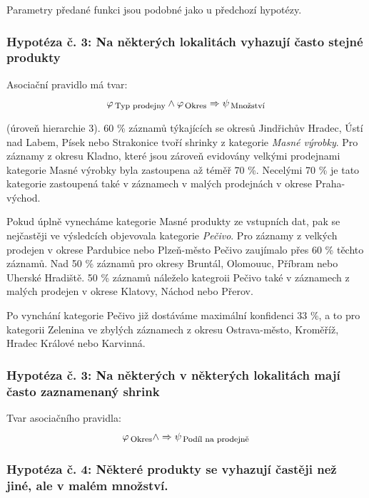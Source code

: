 Parametry předané funkci jsou podobné jako u předchozí hypotézy.

\subsubsection*{Hypotéza č. 3: Na některých lokalitách vyhazují často stejné produkty}

Asociační pravidlo má tvar:
\begin{equation}
    \varphi_{\mbox{\,\footnotesize Typ prodejny}} \land \varphi_{\,\mbox{\footnotesize Okres}} \Rightarrow \psi_{\mbox{\,\footnotesize Množství}}
\end{equation}

(úroveň hierarchie 3). 
60 \% záznamů týkajících se okresů Jindřichův Hradec, Ústí nad Labem, Písek nebo Strakonice tvoří shrinky z kategorie \emph{Masné výrobky}. Pro záznamy z okresu Kladno, které jsou zároveň evidovány velkými prodejnami kategorie Masné výrobky byla zastoupena až téměř 70 \%. Necelými 70 \% je tato kategorie zastoupená také v záznamech v malých prodejnách v okrese Praha-východ.

Pokud úplně vynecháme kategorie Masné produkty ze vstupních dat, pak se nejčastěji ve výsledcích objevovala kategorie \emph{Pečivo}. Pro záznamy z velkých prodejen v okrese Pardubice nebo Plzeň-město Pečivo zaujímalo přes 60 \% těchto záznamů. Nad 50 \% záznamů pro okresy Bruntál, Olomouuc, Příbram nebo Uherské Hradiště. 50 \% záznamů náleželo kategroii Pečivo také v záznamech z malých prodejen v okrese Klatovy, Náchod nebo Přerov.

Po vynchání kategorie Pečivo již dostáváme maximální konfidenci 33 \%, a to pro kategorii Zelenina ve zbylých záznamech z okresu Ostrava-město, Kroměříž, Hradec Králové nebo Karvinná.


\subsubsection*{Hypotéza č. 3: Na některých v některých lokalitách mají často zaznamenaný shrink}

Tvar asociačního pravidla:
\begin{equation}
    \varphi_{\mbox{\,\footnotesize Okres}} \land \Rightarrow \psi_{\mbox{\,\footnotesize Podíl na prodejně}}
\end{equation}



\subsubsection*{Hypotéza č. 4: Některé produkty se vyhazují častěji než jiné, ale v malém množství.}

